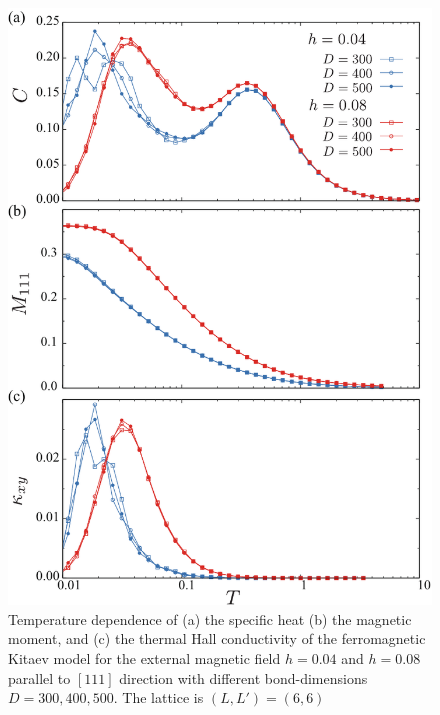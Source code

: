 \documentclass[twocolumn,superscriptaddress,showpacs, longbibliography, aps, prb]{revtex4-2}
\begin{document}
\begin{figure}[htb]
  \begin{center}
    \includegraphics[width=0.9\linewidth]{Figs/plot_CMk.pdf}
  \end{center}
  \caption{Temperature dependence of (a) the specific heat (b) the magnetic moment, and (c) the thermal Hall conductivity of the ferromagnetic Kitaev model for the external magnetic field $h=0.04$ and $h=0.08$ parallel to $[111]$ direction with different bond-dimensions $D=300, 400, 500$. The lattice is $(L, L') = (6, 6)$}
  \label{fig:CMk_XC6}
\end{figure}
\end{document}
